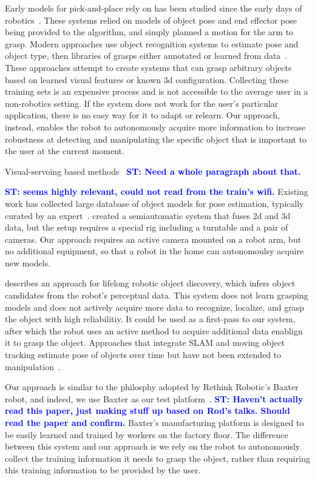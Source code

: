 \documentclass[conference]{IEEEtran}
\newcommand{\stnote}[1]{\textcolor{blue}{\textbf{ST: #1}}}
\begin{document}
Early models for pick-and-place rely on has been studied since the
early days of robotics~\citep{brooks83, lozano89}.  These systems
relied on models of object pose and end effector pose being provided to the
algorithm, and simply planned a motion for the arm to grasp.  Modern
approaches use object recognition systems to estimate pose and object
type, then libraries of grasps either annotated or learned from
data~\citep{saxena08, goldfeder09, morales03}.  These approaches
attempt to create systems that can grasp arbitrary objects based on
learned visual features or known 3d configuration.  Collecting these
training sets is an expensive process and is not accessible to the
average user in a non-robotics setting.  If the system does not work
for the user's particular application, there is no easy way for it to
adapt or relearn.  Our approach, instead, enables the robot to
autonomously acquire more information to increase robustness at
detecting and manipulating the specific object that is important to
the user at the current moment.

Visual-servoing based methods~\citep{chaumette06} \stnote{Need a whole
  paragraph about that. }

\stnote{\citet{ciocarlie14} seems highly relevant, could not read from
  the train's wifi.}  Existing work has collected large database of
object models for pose estimation, typically curated by an
expert~\citep{lai11}.  \citet{kasper12} created a semiautomatic system
that fuses 2d and 3d data, but the setup requires a special rig
including a turntable and a pair of cameras.  Our approach requires an
active camera mounted on a robot arm, but no additional equipment, so
that a robot in the home can autonomoulsy acquire new models.

\citet{collect14} describes an approach for lifelong robotic object
discovery, which infers object candidates from the robot's perceptual
data.  This system does not learn grasping models and does not
actively acquire more data to recognize, localize, and grasp the
object with high reliabilitiy.  It could be used as a first-pass to
our system, after which the robot uses an active method to acquire
additional data enablign it to grasp the object.  Approaches that
integrate SLAM and moving object tracking estimate pose of objects
over time but have not been extended to manipulation~\citep{wang07,
  gallagher09, salas-moreno13, selvatici08}.

Our approach is similar to the philosphy adopted by Rethink Robotic's
Baxter robot, and indeed, we use Baxter as our test
platform~\citep{fitzgerald13}.  \stnote{Haven't actually read this
  paper, just making stuff up based on Rod's talks.  Should read the
  paper and confirm.}  Baxter's manufacturing platform is designed to
be easily learned and trained by workers on the factory floor.  The
difference between this system and our approach is we rely on the
robot to autonomously collect the training information it needs to
grasp the object, rather than requiring this training information to
be provided by the user.
\end{document}
